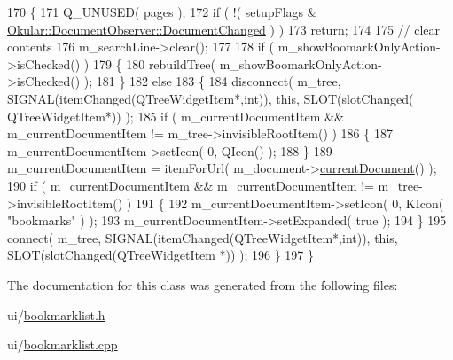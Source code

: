 \begin{DoxyCode}
170 \{
171     Q\_UNUSED( pages );
172     \textcolor{keywordflow}{if} ( !( setupFlags & \hyperlink{classOkular_1_1DocumentObserver_aba00584af99894f95a9650e91f109d40ae599564392c01b22e96eff7602c4dd03}{Okular::DocumentObserver::DocumentChanged}
       ) )
173         \textcolor{keywordflow}{return};
174 
175     \textcolor{comment}{// clear contents}
176     m\_searchLine->clear();
177 
178     \textcolor{keywordflow}{if} ( m\_showBoomarkOnlyAction->isChecked() )
179     \{
180         rebuildTree( m\_showBoomarkOnlyAction->isChecked() );
181     \}
182     \textcolor{keywordflow}{else}
183     \{
184         disconnect( m\_tree, SIGNAL(itemChanged(QTreeWidgetItem*,\textcolor{keywordtype}{int})), \textcolor{keyword}{this}, SLOT(slotChanged(
      QTreeWidgetItem*)) );
185         \textcolor{keywordflow}{if} ( m\_currentDocumentItem && m\_currentDocumentItem != m\_tree->invisibleRootItem()  )
186         \{
187             m\_currentDocumentItem->setIcon( 0, QIcon() );
188         \}
189         m\_currentDocumentItem = itemForUrl( m\_document->\hyperlink{classOkular_1_1Document_acb6f05a191623dafbdf5d4788dd98fed}{currentDocument}() );
190         \textcolor{keywordflow}{if} ( m\_currentDocumentItem && m\_currentDocumentItem != m\_tree->invisibleRootItem()  )
191         \{
192             m\_currentDocumentItem->setIcon( 0, KIcon( \textcolor{stringliteral}{"bookmarks"} ) );
193             m\_currentDocumentItem->setExpanded( \textcolor{keyword}{true} );
194         \}
195         connect( m\_tree, SIGNAL(itemChanged(QTreeWidgetItem*,\textcolor{keywordtype}{int})), \textcolor{keyword}{this}, SLOT(slotChanged(QTreeWidgetItem
      *)) );
196     \}
197 \}
\end{DoxyCode}


The documentation for this class was generated from the following files\+:\begin{DoxyCompactItemize}
\item 
ui/\hyperlink{bookmarklist_8h}{bookmarklist.\+h}\item 
ui/\hyperlink{bookmarklist_8cpp}{bookmarklist.\+cpp}\end{DoxyCompactItemize}
